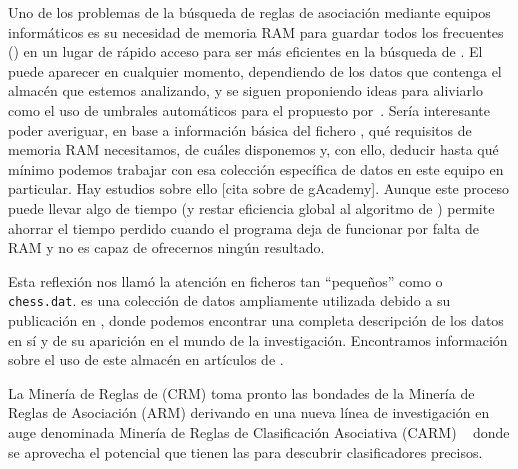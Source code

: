 Uno de los problemas de la búsqueda de reglas de asociación mediante equipos informáticos es su necesidad de memoria RAM para guardar todos los \itemsets frecuentes (\aprioriL) en un lugar de rápido acceso para ser más eficientes en la búsqueda de \ars. El \dilemaIR puede aparecer en cualquier momento, dependiendo de los datos que contenga el almacén \D que estemos analizando, y se siguen proponiendo ideas para aliviarlo como el uso de umbrales automáticos para el \soporte propuesto por~\citet{SadhasivamAngamuthu-MiningRareItemsetWithAutomatedSupportThresholds-2011}. Sería interesante poder averiguar, en base a información básica del fichero \D, qué requisitos de memoria RAM necesitamos, de cuáles disponemos y, con ello, deducir hasta qué \soporte mínimo podemos trabajar con esa colección específica de datos en este equipo en particular. Hay estudios sobre ello [cita sobre \mushroom de gAcademy]. Aunque este proceso puede llevar algo de tiempo (y restar eficiencia global al algoritmo de \FIM) permite ahorrar el tiempo perdido cuando el programa deja de funcionar por falta de RAM y no es capaz de ofrecernos ningún resultado.

Esta reflexión nos llamó la atención en ficheros tan "`pequeños"' como \mushroom o \texttt{chess.dat}. \mushroom es una colección de datos ampliamente utilizada debido a su publicación en , donde podemos encontrar una completa descripción de los datos en sí y de su aparición en el mundo de la investigación. Encontramos información sobre el uso de este almacén \D en artículos de \clasificacion.

La Minería de Reglas de \Clasificacion (CRM) toma pronto las bondades de la Minería de Reglas de Asociación (ARM) derivando en una nueva línea de investigación en auge denominada Minería de Reglas de Clasificación Asociativa (CARM) ~\citep{LiuHsuMa-IntegratingClassificationAndARM-1998, Bayardo-EfficientlyMiningLongPatternsFromDB-1998, WangXinCoenen-MiningEfficientlySignificantCAR-2008} donde se aprovecha el potencial que tienen las \ars para descubrir clasificadores precisos.


